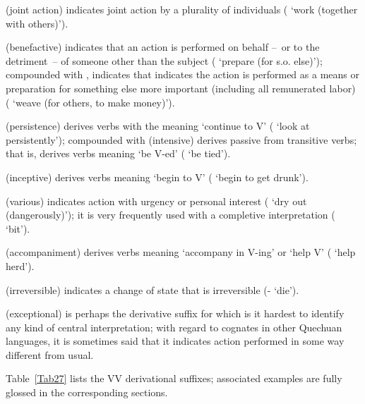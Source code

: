  (joint action) indicates joint action by a plurality of individuals ( ‘work (together with others)’).

 (benefactive) indicates that an action is performed on behalf --~or to the detriment~-- of someone other than the subject ( ‘prepare (for s.o. else)’); compounded with ,  indicates that indicates the action is performed as a means or preparation for something else more important (including all remunerated labor) ( ‘weave (for others, to make money)’).

 (persistence) derives verbs with the meaning ‘continue to V’ ( ‘look at persistently’); compounded with  (intensive)  derives passive from transitive verbs; that is,  derives verbs meaning ‘be V-ed’ ( ‘be tied’).

 (inceptive) derives verbs meaning ‘begin to V’ ( ‘begin to get drunk’).

 (various) indicates action with urgency or personal interest ( ‘dry out (dangerously)’); it is very frequently used with a completive interpretation ( ‘bit’).

 (accompaniment) derives verbs meaning ‘accompany in V-ing’ or ‘help V’ ( ‘help herd’).

 (irreversible) indicates a change of state that is irreversible (- ‘die’).

 (exceptional) is perhaps the derivative suffix for which is it hardest to identify any kind of central interpretation; with regard to cognates in other Quechuan languages, it is sometimes said that it indicates action performed in some way different from usual. 

\noindent
Table~\ref{Tab27}  lists the VV derivational suffixes; associated examples are fully glossed in the corresponding sections.

